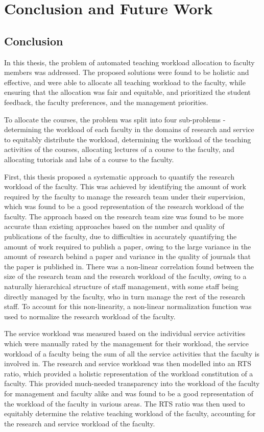\chapter{Conclusion and Future Work}

\section{Conclusion}

In this thesis, the problem of automated teaching workload allocation to faculty members was addressed. The proposed solutions were found to be holistic and effective, and were able to allocate all teaching workload to the faculty, while ensuring that the allocation was fair and equitable, and prioritized the student feedback, the faculty preferences, and the management priorities.

To allocate the courses, the problem was split into four sub-problems - determining the workload of each faculty in the domains of research and service to equitably distribute the workload, determining the workload of the teaching activities of the courses, allocating lectures of a course to the faculty, and allocating tutorials and labs of a course to the faculty.

First, this thesis proposed a systematic approach to quantify the research workload of the faculty. This was achieved by identifying the amount of work required by the faculty to manage the research team under their supervision, which was found to be a good representation of the research workload of the faculty. The approach based on the research team size was found to be more accurate than existing approaches based on the number and quality of publications of the faculty, due to difficulties in accurately quantifying the amount of work required to publish a paper, owing to the large variance in the amount of research behind a paper and variance in the quality of journals that the paper is published in. There was a non-linear correlation found between the size of the research team and the research workload of the faculty, owing to a naturally hierarchical structure of staff management, with some staff being directly managed by the faculty, who in turn manage the rest of the research staff. To account for this non-linearity, a non-linear normalization function was used to normalize the research workload of the faculty.

The service workload was measured based on the individual service activities which were manually rated by the management for their workload, the service workload of a faculty being the sum of all the service activities that the faculty is involved in. The research and service workload was then modelled into an RTS ratio, which provided a holistic representation of the workload constitution of a faculty. This provided much-needed transparency into the workload of the faculty for management and faculty alike and was found to be a good representation of the workload of the faculty in various areas. The RTS ratio was then used to equitably determine the relative teaching workload of the faculty, accounting for the research and service workload of the faculty.

